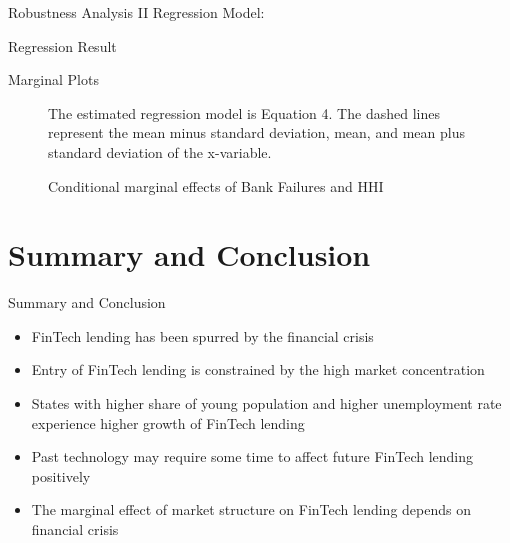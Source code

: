\documentclass[11pt]{beamer}
\begin{document}
\begin{frame}{Robustness Analysis II}
    Regression Model:
    \begin{footnotesize}
        
    \end{footnotesize}
\end{frame}


\begin{frame}{Regression Result}
    \centering
\end{frame}


\begin{frame}{Marginal Plots}
    \begin{figure}
        \centering
        \caption{Conditional marginal effects of Bank Failures and HHI}
        \vspace{0.1cm}
        \hspace{0.25cm} \parbox{10cm}{\scriptsize The estimated regression model is Equation 4. The dashed lines represent the mean minus standard
        deviation, mean, and mean plus standard deviation of the x-variable.}
    \end{figure}
\end{frame}


\section{Summary and Conclusion}

\begin{frame}{Summary and Conclusion}
    \begin{itemize}
        \item FinTech lending has been spurred by the financial crisis
        \item Entry of FinTech lending is constrained by the high market concentration
        \item States with higher share of young population and higher unemployment rate experience higher growth of FinTech lending
        \item Past technology may require some time to affect future FinTech lending positively
        \item The marginal effect of market structure on FinTech lending depends on financial crisis
    \end{itemize}
\end{frame}
\end{document}
